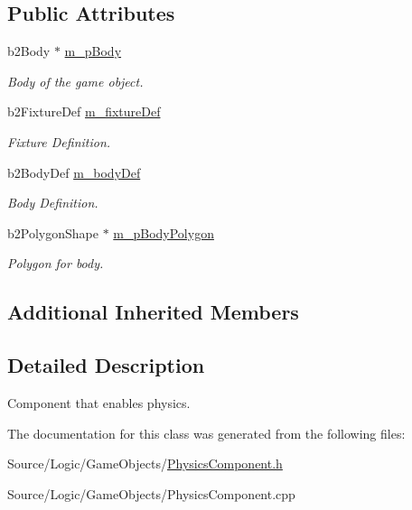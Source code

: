 \subsection*{Public Attributes}
\begin{DoxyCompactItemize}
\item 
\mbox{\label{struct_physics_component_acacb5877966eaecea40298e10e85cfbe}} 
b2\+Body $\ast$ \mbox{\hyperlink{struct_physics_component_acacb5877966eaecea40298e10e85cfbe}{m\+\_\+p\+Body}}
\begin{DoxyCompactList}\small\item\em Body of the game object. \end{DoxyCompactList}\item 
\mbox{\label{struct_physics_component_a1f890d5f3718a03a8d6ef4a94aa14d41}} 
b2\+Fixture\+Def \mbox{\hyperlink{struct_physics_component_a1f890d5f3718a03a8d6ef4a94aa14d41}{m\+\_\+fixture\+Def}}
\begin{DoxyCompactList}\small\item\em Fixture Definition. \end{DoxyCompactList}\item 
\mbox{\label{struct_physics_component_ae909b17a29234ccba3d4f55e61e7a228}} 
b2\+Body\+Def \mbox{\hyperlink{struct_physics_component_ae909b17a29234ccba3d4f55e61e7a228}{m\+\_\+body\+Def}}
\begin{DoxyCompactList}\small\item\em Body Definition. \end{DoxyCompactList}\item 
\mbox{\label{struct_physics_component_a921d6cf550ac6900beb12ba6475171b8}} 
b2\+Polygon\+Shape $\ast$ \mbox{\hyperlink{struct_physics_component_a921d6cf550ac6900beb12ba6475171b8}{m\+\_\+p\+Body\+Polygon}}
\begin{DoxyCompactList}\small\item\em Polygon for body. \end{DoxyCompactList}\end{DoxyCompactItemize}
\subsection*{Additional Inherited Members}


\subsection{Detailed Description}
Component that enables physics. 

The documentation for this class was generated from the following files\+:\begin{DoxyCompactItemize}
\item 
Source/\+Logic/\+Game\+Objects/\mbox{\hyperlink{_physics_component_8h}{Physics\+Component.\+h}}\item 
Source/\+Logic/\+Game\+Objects/Physics\+Component.\+cpp\end{DoxyCompactItemize}
